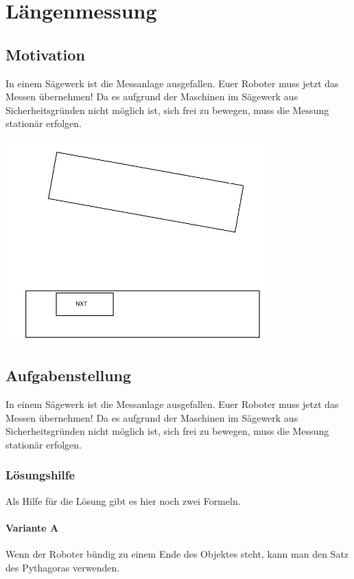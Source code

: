 \chapter{Längenmessung}
\section{Motivation}
In einem Sägewerk ist die Messanlage ausgefallen. Euer Roboter muss jetzt das Messen übernehmen! Da es aufgrund der Maschinen im Sägewerk aus Sicherheitsgründen nicht möglich ist, sich frei zu bewegen, muss die Messung stationär erfolgen.

\begin{capfigure}
	\includegraphics[width=10cm]{images/messen_skizze}
\end{capfigure}

\section{Aufgabenstellung}
In einem Sägewerk ist die Messanlage ausgefallen. Euer Roboter muss jetzt das Messen übernehmen! Da es aufgrund der Maschinen im Sägewerk aus Sicherheitsgründen nicht möglich ist, sich frei zu bewegen, muss die Messung stationär erfolgen. 

\subsection{Lösungshilfe}
Als Hilfe für die Lösung gibt es hier noch zwei Formeln.

\subsubsection{Variante A}
Wenn der Roboter bündig zu einem Ende des Objektes steht, kann man den Satz des Pythagoras verwenden.

